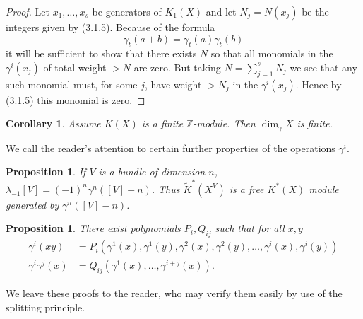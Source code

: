 \documentclass[leqno]{book}
\numberwithin{equation}{section}
\newtheorem{proposition}[theorem]{Proposition}
\newtheorem{corollary}[theorem]{Corollary}
\theoremstyle{definition}
\begin{document}
            \begin{proof}
              Let $x_1, \ldots ,x_{s}$ be generators of $K_1(X)$ and let $N_{j}=N(x_{j})$ be the integers given by (3.1.5). Because of the formula 
              \begin{equation*}
                \gamma_{t}(a+b)=\gamma_{t}(a)\gamma_{t}(b)
              \end{equation*}
              it will be sufficient to show that there exists $N$ so that all monomials in the $\gamma^{i}(x_{j})$ of total weight $>N$ are zero. But taking $N=\sum_{j=1}^{s} N_{j}$ we see that any such monomial must, for some $j$, have weight $>N_{j}$ in the $\gamma^{i}(x_{j})$. Hence by (3.1.5) this monomial is zero.
            \end{proof}

            \begin{corollary}
              Assume $K(X)$ is a finite $\mathbb{Z}$-module. Then $\operatorname{dim}_{\gamma}X$ is finite.
            \end{corollary}

            We call the reader's attention to certain further properties of the operations $\gamma^{i}$.

            \begin{proposition}
              If $V$ is a bundle of dimension $n$, $\lambda_{-1}[V]=(-1)^{n}\gamma^{n}([V]-n)$. Thus $\tilde{K}^{*}(X^{V})$ is a free $K^{*}(X)$ module generated by $\gamma^{n}([V]-n)$.
            \end{proposition}

            \begin{proposition}
              There exist polynomials $P_{i},Q_{ij}$ such that for all $x,y$
              \begin{equation*}
                \begin{aligned}
                  \gamma^{i}(xy)&=P_{i}(\gamma^{1}(x),\gamma^{1}(y),\gamma^{2}(x),\gamma^{2}(y), \ldots ,\gamma^{i}(x),\gamma^{i}(y)) \\
                  \gamma^{i}\gamma^{j}(x)&=Q_{ij}(\gamma^{1}(x), \ldots ,\gamma^{i+j}(x)).
                \end{aligned}
              \end{equation*}
            \end{proposition}
            We leave these proofs to the reader, who may verify them easily by use of the splitting principle.
\end{document}
